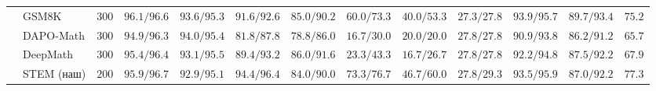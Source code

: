 \documentclass{article}
\begin{document}
\begin{table}[t]
{\begin{tabular}{llccccccccccc}
      & GSM8K                & $300$ & $96.1/96.6$& $93.6/95.3$& $91.6/92.6$& $85.0/90.2$& $60.0/73.3$& $40.0/53.3$& $27.3/27.8$& $93.9/95.7$& $\mathbf{89.7}/93.4$& $75.2$ \\
      & DAPO-Math            & $300$ & $94.9/96.3$& $94.0/95.4$& $81.8/87.8$& $78.8/86.0$& $16.7/30.0$& $20.0/20.0$& $\mathbf{27.8}/27.8$& $90.9/93.8$& $86.2/91.2$& $65.7$ \\
      & DeepMath             & $300$ & $95.4/96.4$& $93.1/95.5$& $89.4/93.2$& $86.0/91.6$& $23.3/43.3$& $16.7/26.7$& $\mathbf{27.8}/27.8$& $92.2/94.8$& $87.5/92.2$& $67.9$ \\
      & STEM (наш)           & $200$ & $95.9/96.7$& $92.9/95.1$& $\mathbf{94.4}/96.4$& $84.0/90.0$& $\mathbf{73.3}/76.7$& $\mathbf{46.7}/60.0$& $\mathbf{27.8}/29.3$& $93.5/95.9$& $87.0/92.2$& $\mathbf{77.3}$ \\
    \bottomrule
  \end{tabular}}
\end{table}
\end{document}
